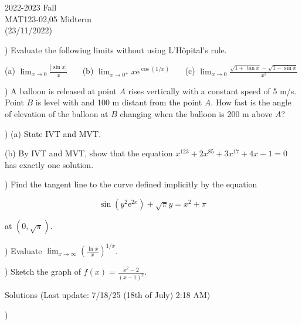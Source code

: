 \documentclass{article}
\begin{document}
\large

\begin{center}
2022-2023 Fall \\MAT123-02,05 Midterm\\(23/11/2022)
\end{center}

) Evaluate the following limits without using L'Hôpital's rule.

\hfill

(a) $\displaystyle \lim_{x\to 0} \frac{\left|\sin x\right|}{x}$ \ \ \ (b) $\displaystyle \lim_{x\to 0^+}x\mathrm{e}^{\displaystyle \cos(1/x)}$ \ \ \ (c) $\displaystyle \lim_{x\to 0}{\frac{\sqrt{1+\tan x} -\sqrt{1-\sin x} }{x^3}}$

\hfill

) A balloon is released at point $A$ rises vertically with a constant speed of 5 m/s. Point $B$ is level with and 100 m distant from the point $A$. How fast is the angle of elevation of the balloon at $B$ changing when the balloon is 200 m above $A$?

\hfill

) (a) State IVT and MVT.

\hfill

\noindent (b) By IVT and MVT, show that the equation $x^{123}+2x^{85} + 3x^{17} + 4x-1 = 0$ has exactly one solution.

\hfill

) Find the tangent line to the curve defined implicitly by the equation

\begin{equation*}
\sin\left(y^2\mathrm{e}^{2x}\right) + \sqrt{\pi}y = x^2 + \pi
\end{equation*}

\noindent at $(0, \sqrt\pi).$

\hfill

) Evaluate $\displaystyle \lim_{x \to \infty} \left(\frac{\ln x}{x}\right)^{1/x}$.

\hfill

) Sketch the graph of $\displaystyle f(x) = \frac{x^2-2}{(x-1)^2}$.

\newpage

\begin{center}
Solutions (Last update: 7/18/25 (18th of July) 2:18 AM)
\end{center}

)

\hfill
\end{document}
